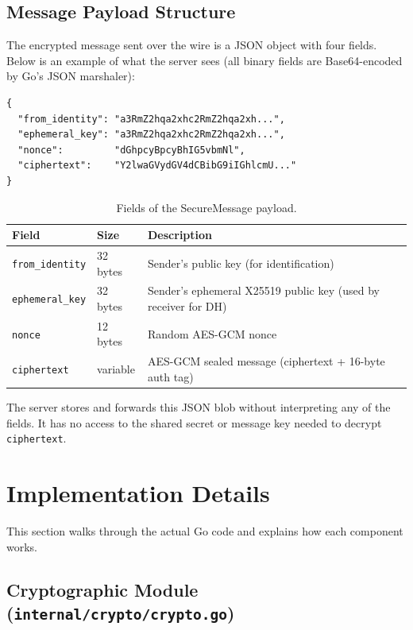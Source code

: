 \documentclass[12pt,a4paper]{article}
\begin{document}
\subsection{Message Payload Structure}

The encrypted message sent over the wire is a JSON object with four fields. Below is an example of what the server sees (all binary fields are Base64-encoded by Go's JSON marshaler):

\begin{lstlisting}[language={}, caption={Example SecureMessage JSON payload (server's view).}, numbers=none]
{
  "from_identity": "a3RmZ2hqa2xhc2RmZ2hqa2xh...",
  "ephemeral_key": "a3RmZ2hqa2xhc2RmZ2hqa2xh...",
  "nonce":         "dGhpcyBpcyBhIG5vbmNl",
  "ciphertext":    "Y2lwaGVydGV4dCBibG9iIGhlcmU..."
}
\end{lstlisting}

\begin{table}[H]
\centering
\begin{tabular}{l l p{5.8cm}}
\toprule
\textbf{Field} & \textbf{Size} & \textbf{Description} \\
\midrule
\texttt{from\_identity} & 32 bytes & Sender's public key (for identification) \\
\texttt{ephemeral\_key} & 32 bytes & Sender's ephemeral X25519 public key (used by receiver for DH) \\
\texttt{nonce} & 12 bytes & Random AES-GCM nonce \\
\texttt{ciphertext} & variable & AES-GCM sealed message (ciphertext + 16-byte auth tag) \\
\bottomrule
\end{tabular}
\caption{Fields of the SecureMessage payload.}
\end{table}

The server stores and forwards this JSON blob without interpreting any of the fields. It has no access to the shared secret or message key needed to decrypt \texttt{ciphertext}.

\section{Implementation Details}
\label{sec:implementation}

This section walks through the actual Go code and explains how each component works.

\subsection{Cryptographic Module (\texttt{internal/crypto/crypto.go})}
\end{document}
